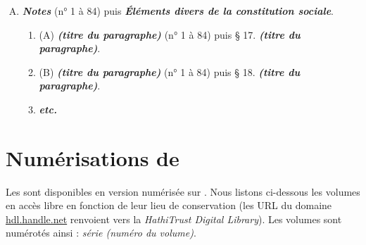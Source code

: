 \begin{enumerate}[A.]
\begin{enumerate}[I.]
        \item (\textbf{\textit{Budget domestique annuel}}\footnote{Cette section ne possède un titre que dans huit monographies}).
        \begin{enumerate}[]
            \item \textit{§ 14. Budget des recettes de l'année.}
            \item \textit{§ 15. Budget des dépenses de l'année.}
            \item \textit{Comptes annexés aux budgets} \footnotesize{(n° 1 à 84) puis} \textit{§ 16. Comptes annexés aux budgets.}
        \end{enumerate}
    \end{enumerate}
    \item \textbf{\textit{Notes}} \footnotesize{(n° 1 à 84) puis} \textbf{\textit{Éléments divers de la constitution sociale}}.
    \begin{enumerate}[]
            \item (A) \textbf{\textit{(titre du paragraphe)}} \footnotesize{(n° 1 à 84) puis} § 17. \textbf{\textit{(titre du paragraphe)}}.
            \item (B) \textbf{\textit{(titre du paragraphe)}} \footnotesize{(n° 1 à 84) puis} § 18. \textbf{\textit{(titre du paragraphe)}}.
            \item \textbf{\textit{etc.}}
        \end{enumerate}
\end{enumerate}

\clearpage

\section{Numérisations de \gb}\label{numgb}

Les \odm{} sont disponibles en version numérisée sur \gb. Nous listons ci-dessous les volumes en accès libre en fonction de leur lieu de conservation (les URL du domaine \url{hdl.handle.net} renvoient vers la \textit{HathiTrust Digital Library}). Les volumes sont numérotés ainsi : \textit{série (numéro du volume)}.

